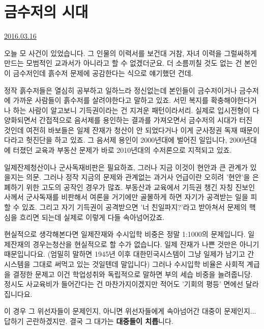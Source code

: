 \section{금수저의 시대}
\href{https://www.kockoc.com/Apoc/678638}{2016.03.16}

\vspace{5mm}

오늘 모 사건이 있었습니다.
그 인물의 이력서를 보건대 거참,
자녀 이력을 그럴싸하게 만드는 모범적인 교과서가 아니라고 할 수 없겠더군요.
더 소름끼칠 것도 없는 건 본인이 금수저인데 흙수저 문제에 공감한다는 식으로 얘기했던 건데.
\vspace{5mm}

정작 흙수저들은 열심히 공부하고 일하느라 정신없는데
본인들이 금수저이거나 금수저에 가까운 사람들이 흙수저를 살려야한다고 말하고 있죠.
서민 복지를 확충해야한다거나 하는 사람이 알고보니 기득권이라는 건 지겨운 패턴이라서리.
실제로 입시전형이 다양화되면서 간접적으로 음서제를 용인하는 결과를 가져오면서 금수저의 시대가 터진 것인데
여전히 바보들은 일제 잔재가 청산이 안 되었다거나 이게 군사정권 독재 때문이다라고 헛진단을 하고 있죠.
그 음서제 용인이 2000년대에 벌어진 일입니다, 2000년대에 터졌던 교육과 부동산 문제가 바로 2010년대의 수저론으로 지적되고 있죠.
\vspace{5mm}

일제잔제청산이나 군사독재비판은 필요하죠, 그러나 지금 이것이 현안과 큰 관계가 있을지는 의문.
그러나 정작 지금의 문제와 관계없는 과거사 언급이란 오히려 '현안'을 은폐하기 위한 고도의 공작인 경우가 많죠.
부동산과 교육에서 기득권 챙긴 자칭 진보인사께서 군사독재를 비판해서 여론을 거기에만 골몰하게 하면 자기가 공격받는 일을 피할 수 있죠.
그리고 자기 기득권이 공격받으면 '너 친일파지?'라고 받아쳐서 문제의 핵심을 흐리면 되는데 실제로 이렇게 다들 속아넘어갔죠.
\vspace{5mm}

현실적으로 생각해본다면 일제잔재와 수시입학 비중은 정말 1:1000의 문제입니다.
일제잔재의 경우는청산을 현실적으로 할 수가 없습니다. 일제 잔재가 나쁜 것만은 아니기 때문입니다요.
(엄밀히 말하면 1945년 이후 대한민국시스템이 그냥 일제가 남기고 간 시스템을 그대로 써먹고 있는 것일텐데 말입니다)
그러나 수시입학 비율은 사회적 계급을 결정한 문제고 이건 학업성취와 독립적으로 말하면 부의 세습 비중을 늘려줍니당.
정시도 사교육비가 들어간다는 건 마찬가지이겠지만 적어도 '기회의 평등' 면에선 달라집니다요.
\vspace{5mm}

이 경우 그 위선자들이 문제인지, 아니면 위선자들에게 속아넘어간 대중이 문제인지...  답하기 곤란하겠지만.
결국 그 대가는 \textbf{대중들이 치릅}니다.
\vspace{5mm}






